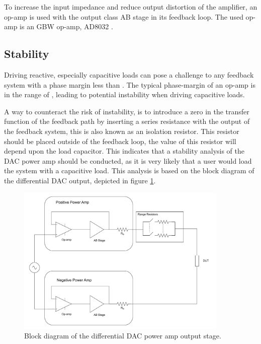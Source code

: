 To increase the input impedance and reduce output distortion of the amplifier, an op-amp is used with the output class AB stage in its feedback loop. The used op-amp is an  GBW op-amp, AD8032 \cite{AD8032_datasheet}. 

\subsection*{Stability}
Driving reactive, especially capacitive loads can pose a challenge to any feedback system with a phase margin less than . The typical phase-margin of an op-amp is in the range of , leading to potential instability when driving capacitive loads.

A way to counteract the risk of instability, is to introduce a zero in the transfer function of the feedback path by inserting a series resistance with the output of the feedback system, this is also known as an isolation resistor. This resistor should be placed outside of the feedback loop, the value of this resistor will depend upon the load capacitor. This indicates that a stability analysis of the DAC power amp should be conducted, as it is very likely that a user would load the system with a capacitive load. This analysis is based on the block diagram of the differential DAC output, depicted in figure \ref{fig_7_1_1_5_DAC_POWER_AMP_BLOCK}. 


\begin{figure}[H]
    \centering
    \includegraphics[clip, trim=0 0 0 0, width=0.9\textwidth]{Sections/7_SystemDesign/Figures/DAC_POWER_BLOCK.pdf}
    \caption{Block diagram of the differential DAC power amp output stage.}
    \label{fig_7_1_1_5_DAC_POWER_AMP_BLOCK}
\end{figure}

